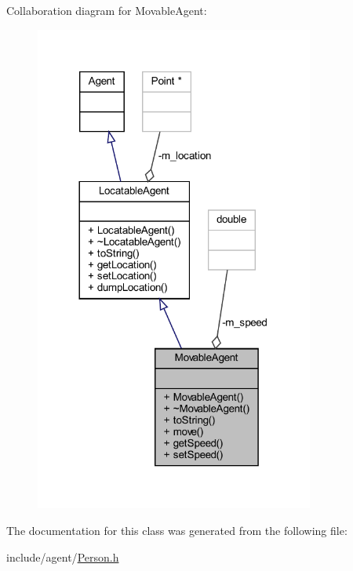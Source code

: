 Collaboration diagram for Movable\+Agent\+:\nopagebreak
\begin{figure}[H]
\begin{center}
\leavevmode
\includegraphics[width=260pt]{class_movable_agent__coll__graph}
\end{center}
\end{figure}


The documentation for this class was generated from the following file\+:\begin{DoxyCompactItemize}
\item 
include/agent/\hyperlink{_person_8h}{Person.\+h}\end{DoxyCompactItemize}
